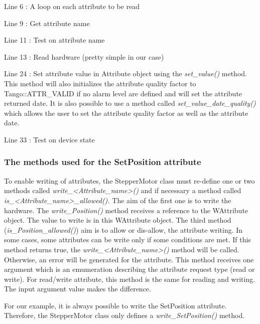 Line 6 : A loop on each attribute to be read

Line 9 : Get attribute name

Line 11 : Test on attribute name

Line 13 : Read hardware (pretty simple in our case)

Line 24 : Set attribute value in Attribute object using the \emph{set\_value()}
method. This method will also initializes the attribute quality factor
to Tango::ATTR\_VALID if no alarm level are defined
and will set the attribute returned date. It is also possible to use
a method called \emph{set\_value\_date\_quality()}
which allows the user to set the attribute quality factor as well
as the attribute date.

Line 33 : Test on device state


\subsubsection{The methods used for the SetPosition attribute}

To enable writing of attributes, the StepperMotor
class must re-define one or two methods called \emph{write\_<Attribute\_name>()}
and if necessary a method called \emph{is\_<Attribute\_name>\_allowed().}
The aim of the first one is to write the hardware. The \emph{write\_Position()}
method receives a reference to the WAttribute object. The value to
write is in this WAttribute object. The third method (\emph{is\_Position\_allowed()})
aim is to allow or dis-allow, the attribute writing. In some cases,
some attributes can be write only if some conditions are met. If this
method returns true, the \emph{write\_<Attribute\_name>()} method
will be called. Otherwise, an error will be generated for the attribute.
This method receives one argument which is an emumeration describing
the attribute request type (read or write). For read/write attribute,
this method is the same for reading and writing. The input argument
value makes the difference.

For our example, it is always possible to write the SetPosition attribute.
Therefore, the StepperMotor class only defines a \emph{write\_SetPosition()}
method.


